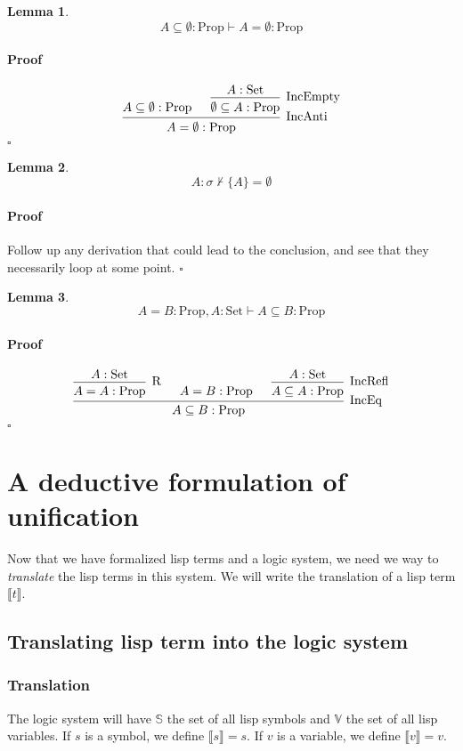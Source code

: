 \documentclass[]{article}
\newcommand{\sem}[1]{\llbracket #1 \rrbracket}
\newcommand{\V}{\mathscr{V}}
\newcommand{\1}{\mathbbm{1}}
\newcommand{\0}{\mathbbm{0}}
\renewcommand{\S}{\mathbb{S}}
\renewcommand{\V}{\mathbb{V}}
\newtheorem{lem}{Lemma}
\newenvironment{prf}{\paragraph{Proof}}{\hfill$\square$}
\newcommand{\Prop}{\text{Prop}}
\newcommand{\Set}{\text{Set}}
\newcommand{\proof}[1]{{\scantokens{\begin{prooftree}#1\end{prooftree}}}}
\renewcommand{\subset}{\subseteq}
\begin{document}
\begin{lem}\label{inc_empty_empty}
    \[A\subset\emptyset:\Prop\vdash A = \emptyset:\Prop\]
\end{lem}
\begin{prf}
    \[\proof{
        \hypo{A\subset\emptyset:\Prop}
        \hypo{A:\Set}
        \infer1[IncEmpty]{\emptyset\subset A:\Prop}
        \infer2[IncAnti]{A = \emptyset:\Prop}
    }\]
\end{prf}

\begin{lem}\label{sing_neq_empty}
    \[A:\sigma\not\vdash \{A\} = \emptyset\]
\end{lem}
\begin{prf}
    Follow up any derivation that could lead to the conclusion, and see that
    they necessarily loop at some point.
\end{prf}

\begin{lem}\label{eq_to_inc}
    \[A = B:\Prop,A:\Set\vdash A\subset B:\Prop\]
\end{lem}
\begin{prf}\[\proof{
        \hypo{A:\Set}
        \infer1[R]{A = A:\Prop}
        \hypo{A = B:\Prop}
        \hypo{A:\Set}
        \infer1[IncRefl]{A \subset A : \Prop}
        \infer3[IncEq]{A\subset B :\Prop}
}\]\end{prf}

\section{A deductive formulation of unification}

Now that we have formalized lisp terms and a logic system, we need we way to
\emph{translate} the lisp terms in this system. We will write the translation
of a lisp term $\sem{t}$.

\subsection{Translating lisp term into the logic system}

\subsubsection{Translation}

The logic system will have $\S$ the set of all lisp symbols and $\V$ the set
of all lisp variables. If $s$ is a symbol, we define $\sem{s} = s$. If $v$ is a
variable, we define $\sem{v} = v$.
\end{document}
